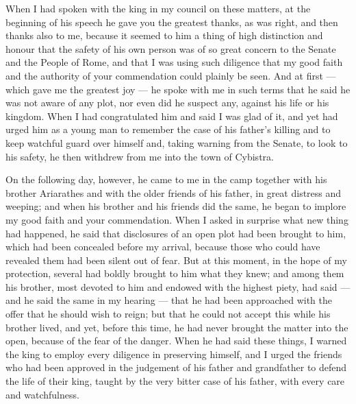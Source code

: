  When I had spoken with the king in my council on these matters, at the beginning of his speech he gave you the greatest thanks, as was right, and then thanks also to me, because it seemed to him a thing of high distinction and honour that the safety of his own person was of so great concern to the Senate and the People of Rome, and that I was using such diligence that my good faith and the authority of your commendation could plainly be seen. And at first --- which gave me the greatest joy --- he spoke with me in such terms that he said he was not aware of any plot, nor even did he suspect any, against his life or his kingdom. When I had congratulated him and said I was glad of it, and yet had urged him as a young man to remember the case of his father's killing and to keep watchful guard over himself and, taking warning from the Senate, to look to his safety, he then withdrew from me into the town of Cybistra.

 On the following day, however, he came to me in the camp together with his brother Ariarathes and with the older friends of his father, in great distress and weeping; and when his brother and his friends did the same, he began to implore my good faith and your commendation. When I asked in surprise what new thing had happened, he said that disclosures of an open plot had been brought to him, which had been concealed before my arrival, because those who could have revealed them had been silent out of fear. But at this moment, in the hope of my protection, several had boldly brought to him what they knew; and among them his brother, most devoted to him and endowed with the highest piety, had said --- and he said the same in my hearing --- that he had been approached with the offer that he should wish to reign; but that he could not accept this while his brother lived, and yet, before this time, he had never brought the matter into the open, because of the fear of the danger. When he had said these things, I warned the king to employ every diligence in preserving himself, and I urged the friends who had been approved in the judgement of his father and grandfather to defend the life of their king, taught by the very bitter case of his father, with every care and watchfulness.

